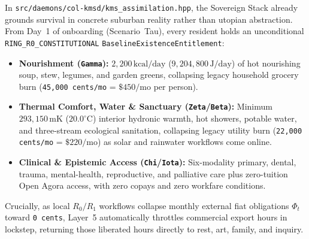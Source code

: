 In \texttt{src/daemons/col-kmsd/kms\_assimilation.hpp}, the Sovereign Stack already grounds survival
in concrete suburban reality rather than utopian abstraction. From Day~1 of onboarding (Scenario~Tau),
every resident holds an unconditional \texttt{RING\_R0\_CONSTITUTIONAL}
\texttt{BaselineExistenceEntitlement}:
\begin{itemize}
    \item \textbf{Nourishment (\texttt{Gamma}):} $2{,}200\,\mathrm{kcal/day}$ ($9{,}204{,}800\,\mathrm{J/day}$)
    of hot nourishing soup, stew, legumes, and garden greens, collapsing legacy household grocery
    burn (\texttt{45,000 cents/mo} = $\$450/\mathrm{mo}$ per person).
    \item \textbf{Thermal Comfort, Water \& Sanctuary (\texttt{Zeta}/\texttt{Beta}):} Minimum
    $293{,}150\,\mathrm{mK}$ ($20.0^\circ\mathrm{C}$) interior hydronic warmth, hot showers, potable
    water, and three-stream ecological sanitation, collapsing legacy utility burn
    (\texttt{22,000 cents/mo} = $\$220/\mathrm{mo}$) as solar and rainwater workflows come online.
    \item \textbf{Clinical \& Epistemic Access (\texttt{Chi}/\texttt{Iota}):} Six-modality primary,
    dental, trauma, mental-health, reproductive, and palliative care plus zero-tuition Open Agora
    access, with zero copays and zero workfare conditions.
\end{itemize}

Crucially, as local $R_0/R_1$ workflows collapse monthly external fiat obligations $\Phi_t$ toward
\texttt{0 cents}, Layer~5 automatically throttles commercial export hours in lockstep, returning
those liberated hours directly to rest, art, family, and inquiry.

